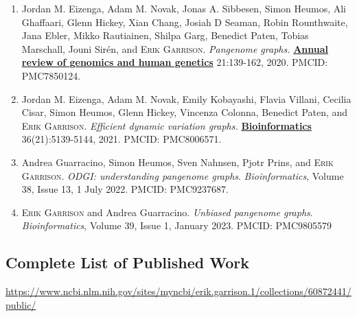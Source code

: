 \documentclass{nihbiosketch}
\newcommand{\hijournal}[1]{{\bf {\uline{#1}}}}
\begin{document}
\begin{enumerate}
  \begin{enumerate}

    \item Jordan M. Eizenga, Adam M. Novak, Jonas A. Sibbesen, Simon Heumos, Ali Ghaffaari, Glenn Hickey, Xian Chang, Josiah D Seaman, Robin Rounthwaite, Jana Ebler, Mikko Rautiainen, Shilpa Garg, Benedict Paten, Tobias Marschall, Jouni Sirén, and \textsc{Erik Garrison}. \emph{Pangenome graphs.} \hijournal{Annual review of genomics and human genetics} 21:139-162, 2020. PMCID: PMC7850124.

  \item Jordan M. Eizenga, Adam M. Novak, Emily Kobayashi, Flavia Villani, Cecilia Cisar, Simon Heumos, Glenn Hickey, Vincenza Colonna, Benedict Paten, and \textsc{Erik Garrison}. \emph{Efficient dynamic variation graphs.} \hijournal{Bioinformatics} 36(21):5139-5144, 2021. PMCID: PMC8006571.

  \item Andrea Guarracino, Simon Heumos, Sven Nahnsen, Pjotr Prins, and \textsc{Erik Garrison}. \emph{ODGI: understanding pangenome graphs}. \emph{Bioinformatics},  Volume 38, Issue 13, 1 July 2022. PMCID: PMC9237687.

  \item \textsc{Erik Garrison} and Andrea Guarracino. \emph{Unbiased pangenome graphs}. \emph{Bioinformatics}, Volume 39, Issue 1, January 2023. PMCID: PMC9805579

  \end{enumerate}

\end{enumerate}

\subsection*{Complete List of Published Work}

\begin{datetbl}
  \url{https://www.ncbi.nlm.nih.gov/sites/myncbi/erik.garrison.1/collections/60872441/public/}
\end{datetbl}


\end{document}
